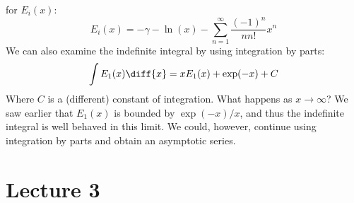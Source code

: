             for $E_{i}(x)$:
            \begin{equation}
                E_{i}(x)=-\gamma-\ln(x)
                -\sum_{n=1}^{\infty}\frac{(-1)^{n}}{nn!}x^{n}
            \end{equation}
            We can also examine the indefinite integral by using
            integration by parts:
            \begin{equation}
                \int{E}_{1}(x)\diff{x}=
                xE_{1}(x)+\exp(-x)+C
            \end{equation}
            Where $C$ is a (different) constant of integration.
            What happens as $x\rightarrow\infty$? We saw earlier
            that $E_{1}(x)$ is bounded by
            $\exp(-x)/x$, and thus the indefinite integral is well
            behaved in this limit. We could, however, continue
            using integration by parts and obtain an asymptotic
            series.
    \section{Lecture 3}
